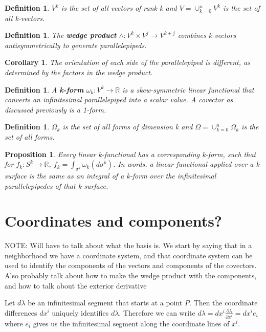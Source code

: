 \documentclass{book}
\newtheorem{defn}[equation]{Definition}
\newtheorem{coro}[equation]{Corollary}
\newtheorem{prop}[equation]{Proposition}
\begin{document}
\begin{defn}
	$V^k$ is the set of all vectors of rank k and $V = \cup_{k=0}^n V^k$ is the set of all k-vectors. 
	\end{defn}



\begin{defn}
	
	The \textbf{wedge product} $\wedge : V^k\times V^j \to V^{k+j}$ combines k-vectors antisymmetrically to generate parallelepipeds. 
\end{defn}

\begin{coro}
	The orientation of each side of the parallelepiped is different, as determined by the factors in the wedge product. 
\end{coro}

\begin{defn}
	A \textbf{k-form} $\omega_k : V^k \to \mathbb{R}$ is a skew-symmetric linear functional that converts an infinitesimal parallelepiped into a scalar value. A covector as discussed previously is a 1-form. 
\end{defn}

\begin{defn}
	$\Omega_k$ is the set of all forms of dimension k and $\Omega = \cup_{k=0}^n\Omega_k$ is the set of all forms. 
\end{defn}

\begin{prop}
	Every linear k-functional has a corresponding k-form, such that for $f_k : S^k \to \mathbb{R}$, $f_k = \int_{\sigma^k} \omega_k(d\sigma^k)$. In words, a linear functional applied over a k-surface is the same as an integral of a k-form over the infinitesimal parallelepipedes of that k-surface. 
\end{prop}

\section{Coordinates and components?}

NOTE: Will have to talk about what the basis is. We start by saying that in a neighborhood we have a coordinate system, and that coordinate system can be used to identify the components of the vectors and components of the covectors. Also probably talk about how to make the wedge product with the components, and how to talk about the exterior derivative

Let $d\lambda$ be an infinitesimal segment that starts at a point $P$. Then the coordinate differences $dx^i$ uniquely identifies $d\lambda$. Therefore we can write $d\lambda = dx^i \frac{\partial \lambda}{\partial x^i} = dx^i e_i$ where $e_i$ gives us the infinitesimal segment along the coordinate lines of $x^i$.
\end{document}

